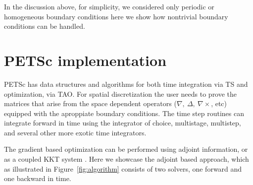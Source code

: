 \documentclass[10pt]{article}
\begin{document}
In the discussion above, for simplicity, we considered only periodic or homogeneous boundary conditions here we show how nontrivial boundary conditions can be handled. 

\section{PETSc implementation}

PETSc has data structures and algorithms for both time integration via TS and optimization, via TAO.
For spatial discretization the user needs to prove the matrices that arise from the space dependent operators ($\nabla,\ \Delta,\ \nabla \times$, etc) equipped with the aproppiate boundary conditions. The time step routines can integrate forward in time using the integrator of choice, multistage, multistep, and several other more exotic time integrators.

The gradient based optimization can be performed using adjoint information, or as a coupled KKT system \cite{Haber_2007}. Here we showcase the adjoint based approach, which as illustrated in Figure~\ref{fig:algorithm} consists of two solvers, one forward and one backward in time.
\end{document}
